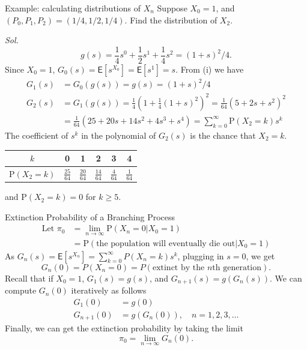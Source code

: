\documentclass[letterpaper, mathserif]{beamer}
\def\p{\mathrm P}
\def\E{\mathsf E}
\begin{document}
\begin{frame}{Example: calculating distributions of $X_n$}
Suppose $X_0=1$, and $(P_0,P_1,P_2)=(1/4,1/2,1/4)$. Find the distribution of $X_2$.\par
{\em Sol.}
$$g(s)=\frac{1}{4}s^0+\frac{1}{2}s^1+\frac{1}{4}s^2=(1+s)^2/4.$$
Since $X_0=1$, $G_0(s)=\E[s^{X_0}]=\E[s^{1}]=s$. From (i) we have
\begin{align*}
G_1(s)&=G_0(g(s))=g(s)=(1+s)^2/4\\
G_2(s)&=G_1(g(s))=\frac{1}{4}(1+\frac{1}{4}(1+s)^2)^2
      =\frac{1}{64}(5+2s+s^2)^2\\
      &=\frac{1}{64}(25+20s+14s^2+4s^3+s^4)
      =\sum_{k=0}^{\infty}\p(X_2=k)s^k
\end{align*}
The coefficient of $s^k$ in the polynomial of $G_2(s)$ is the chance that $X_2=k$.
\begin{center}\vspace{-10pt}
\renewcommand{\arraystretch}{1.25}
\begin{tabular}{c|ccccc}
$k$         & 0 & 1 & 2 & 3 & 4\\
\hline
$\p(X_2=k)$ &$\frac{25}{64}$&$\frac{20}{64}$&$\frac{14}{64}$&$\frac{4}{64}$&$\frac{1}{64}$
\end{tabular}
\end{center}
and $\p(X_2=k)=0$ for $k\ge 5.$
\end{frame}
\begin{frame}{Extinction Probability of a Branching Process}
\begin{align*}
\text{Let }\pi_0 &= \lim_{n\to\infty}\p(X_n = 0|X_0 = 1)\\
      &=\p(\text{the population will eventually die out}|X_0 = 1)
\end{align*}
As $G_n(s)=\E[s^{X_n}]=\sum_{k=0}^{\infty}P(X_n=k)s^k$, plugging in $s=0$, we get
\[
G_n(0)=P(X_n=0)=P(\text{extinct by the $n$th generation}).
\]
Recall that if $X_0=1$, $G_1(s)=g(s)$, and $G_{n+1}(s)=g(G_n(s))$.
We can compute $G_n(0)$ iteratively as follows
\begin{align*}
G_1(0)&=g(0)\\
G_{n+1}(0)&=g(G_n(0)),\quad n=1,2,3,\ldots
\end{align*}
Finally, we can get the extinction probability by taking the limit
\[\pi_0=\lim_{n\to\infty}G_n(0).\]
\end{frame}
\end{document}

